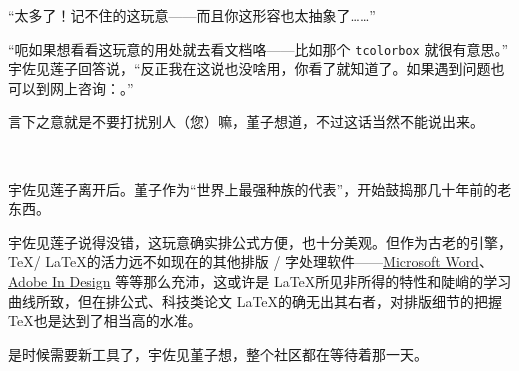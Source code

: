 “太多了！记不住的这玩意——而且你这形容也太抽象了……”

“呃如果想看看这玩意的用处就去看文档咯——比如那个 \verb"tcolorbox" 就很有意思。” 宇佐见莲子回答说，“反正我在这说也没啥用，你看了就知道了。如果遇到问题也可以到网上咨询：。”

言下之意就是不要打扰别人（您）嘛，堇子想道，不过这话当然不能说出来。

~

宇佐见莲子离开后。堇子作为“世界上最强种族的代表”，开始鼓捣那几十年前的老东西。

宇佐见莲子说得没错，这玩意确实排公式方便，也十分美观。但作为古老的引擎，\TeX / \LaTeX 的活力远不如现在的其他排版 / 字处理软件——\href{https://www.microsoft.com/en-us/microsoft-365/word}{Microsoft Word}、\href{https://www.adobe.com/products/indesign.html}{Adobe In Design} 等等那么充沛，这或许是 \LaTeX 所见非所得的特性和陡峭的学习曲线所致，但在排公式、科技类论文 \LaTeX 的确无出其右者，对排版细节的把握 \TeX 也是达到了相当高的水准。

是时候需要新工具了，宇佐见堇子想，整个社区都在等待着那一天。
